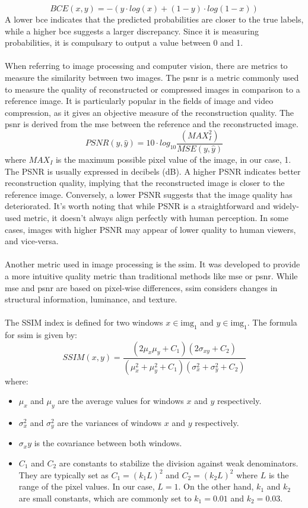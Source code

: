\[BCE(x, y) = -(y \cdot log(x) + (1 - y) \cdot log (1 - x))\]
A lower \gls{bce} indicates that the predicted probabilities are closer to the true labels, while a higher \gls{bce} suggests a larger discrepancy. Since it is measuring probabilities, it is compulsary to output a value between 0 and 1. 
\\
\\
When referring to image processing and computer vision, there are metrics to measure the similarity between two images. The \gls{psnr} is a metric commonly used to measure the quality of reconstructed or compressed images in comparison to a reference image. It is particularly popular in the fields of image and video compression, as it gives an objective measure of the reconstruction quality. The \gls{psnr} is derived from the \gls{mse} between the reference and the reconstructed image.
\[PSNR(y, \hat{y}) = 10 \cdot log_{10} \frac{(MAX_I^2)}{MSE(y, \hat{y})}\]
where $MAX_I$ is the maximum possible pixel value of the image, in our case, 1. The PSNR is usually expressed in decibels (dB). A higher PSNR indicates better reconstruction quality, implying that the reconstructed image is closer to the reference image. Conversely, a lower PSNR suggests that the image quality has deteriorated. It's worth noting that while PSNR is a straightforward and widely-used metric, it doesn't always align perfectly with human perception. In some cases, images with higher PSNR may appear of lower quality to human viewers, and vice-versa. 
\\
\\
Another metric used in image processing is the \gls{ssim}. It was developed to provide a more intuitive quality metric than traditional methods like \gls{mse} or \gls{psnr}. While \gls{mse} and \gls{psnr} are based on pixel-wise differences, \gls{ssim} considers changes in structural information, luminance, and texture.\\
\\
The SSIM index is defined for two windows $x \in \text{img}_1$ and $y \in \text{img}_1$.  The formula for \gls{ssim} is given by:
\[SSIM(x, y) = \frac{(2 \mu_x \mu_y + C_1)(2 \sigma_{xy} + C_2)}{(\mu_x^2 + \mu_y^2 + C_1) (\sigma_x^2 + \sigma_y^2 + C_2)}\]
where:
\begin{itemize}
	\item $\mu_x$ and $\mu_y$ are the average values for windows $x$ and $y$ respectively.
	\item $\sigma_x^2$ and $\sigma_y^2$ are the variances of windows $x$ and $y$ respectively.
	\item $\sigma_xy$ is the covariance between both windows.
	\item $C_1$ and $C_2$ are constants to stabilize the division against weak denominators. They are typically set as $C_1 = (k_1L)^2$ and $C_2 = (k_2L)^2$ where $L$ is the range of the pixel values. In our case, $L = 1$. On the other hand, $k_1$ and $k_2$ are small constants, which are commonly set to $k_1=0.01$ and $k_2=0.03$. 
\end{itemize}
